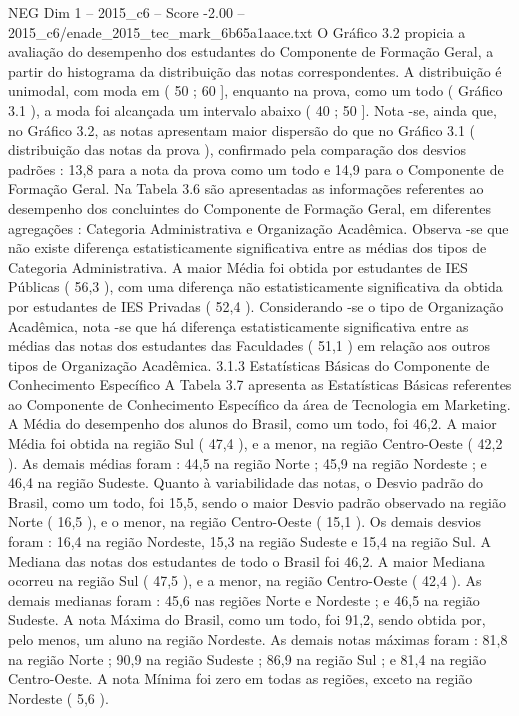 \begin{textsample}{NEG Dim 1 – 2015\_c6 – Score -2.00 – 2015\_c6/enade\_2015\_tec\_mark\_6b65a1aace.txt}
O Gráfico 3.2 propicia a avaliação do desempenho dos estudantes do Componente de Formação Geral, a partir do histograma da distribuição das notas correspondentes.
A distribuição é unimodal, com moda em ( 50 ; 60 ], enquanto na prova, como um todo ( Gráfico 3.1 ), a moda foi alcançada um intervalo abaixo ( 40 ; 50 ].
Nota -se, ainda que, no Gráfico 3.2, as notas apresentam maior dispersão do que no Gráfico 3.1 ( distribuição das notas da prova ), confirmado pela comparação dos desvios padrões : 13,8 para a nota da prova como um todo e 14,9 para o Componente de Formação Geral.
Na Tabela 3.6 são apresentadas as informações referentes ao desempenho dos concluintes do Componente de Formação Geral, em diferentes agregações : Categoria Administrativa e Organização Acadêmica.
Observa -se que não existe diferença estatisticamente significativa entre as médias dos tipos de Categoria Administrativa.
A maior Média foi obtida por estudantes de IES Públicas ( 56,3 ), com uma diferença não estatisticamente significativa da obtida por estudantes de IES Privadas ( 52,4 ).
Considerando -se o tipo de Organização Acadêmica, nota -se que há diferença estatisticamente significativa entre as médias das notas dos estudantes das Faculdades ( 51,1 ) em relação aos outros tipos de Organização Acadêmica. 3.1.3 Estatísticas Básicas do Componente de Conhecimento Específico A Tabela 3.7 apresenta as Estatísticas Básicas referentes ao Componente de Conhecimento Específico da área de Tecnologia em Marketing.
A Média do desempenho dos alunos do Brasil, como um todo, foi 46,2.
A maior Média foi obtida na região Sul ( 47,4 ), e a menor, na região Centro-Oeste ( 42,2 ).
As demais médias foram : 44,5 na região Norte ; 45,9 na região Nordeste ; e 46,4 na região Sudeste.
Quanto à variabilidade das notas, o Desvio padrão do Brasil, como um todo, foi 15,5, sendo o maior Desvio padrão observado na região Norte ( 16,5 ), e o menor, na região Centro-Oeste ( 15,1 ).
Os demais desvios foram : 16,4 na região Nordeste, 15,3 na região Sudeste e 15,4 na região Sul.
A Mediana das notas dos estudantes de todo o Brasil foi 46,2.
A maior Mediana ocorreu na região Sul ( 47,5 ), e a menor, na região Centro-Oeste ( 42,4 ).
As demais medianas foram : 45,6 nas regiões Norte e Nordeste ; e 46,5 na região Sudeste.
A nota Máxima do Brasil, como um todo, foi 91,2, sendo obtida por, pelo menos, um aluno na região Nordeste.
As demais notas máximas foram : 81,8 na região Norte ; 90,9 na região Sudeste ; 86,9 na região Sul ; e 81,4 na região Centro-Oeste.
A nota Mínima foi zero em todas as regiões, exceto na região Nordeste ( 5,6 ).

\end{textsample}
